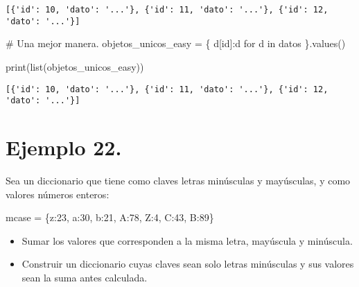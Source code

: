 \documentclass[
  letterpaper,
  DIV=11,
  numbers=noendperiod]{scrreprt}
\newenvironment{Shaded}{\begin{snugshade}}{\end{snugshade}}
\newcommand{\BuiltInTok}[1]{\textcolor[rgb]{0.00,0.23,0.31}{#1}}
\newcommand{\CommentTok}[1]{\textcolor[rgb]{0.37,0.37,0.37}{#1}}
\newcommand{\ControlFlowTok}[1]{\textcolor[rgb]{0.00,0.23,0.31}{#1}}
\newcommand{\DecValTok}[1]{\textcolor[rgb]{0.68,0.00,0.00}{#1}}
\newcommand{\KeywordTok}[1]{\textcolor[rgb]{0.00,0.23,0.31}{#1}}
\newcommand{\NormalTok}[1]{\textcolor[rgb]{0.00,0.23,0.31}{#1}}
\newcommand{\OperatorTok}[1]{\textcolor[rgb]{0.37,0.37,0.37}{#1}}
\newcommand{\StringTok}[1]{\textcolor[rgb]{0.13,0.47,0.30}{#1}}
\begin{document}
\begin{verbatim}
[{'id': 10, 'dato': '...'}, {'id': 11, 'dato': '...'}, {'id': 12, 'dato': '...'}]
\end{verbatim}

\begin{Shaded}
\begin{Highlighting}[]
\CommentTok{\# Una mejor manera.}
\NormalTok{objetos\_unicos\_easy }\OperatorTok{=}\NormalTok{ \{ d[}\StringTok{\textquotesingle{}id\textquotesingle{}}\NormalTok{]:d }\ControlFlowTok{for}\NormalTok{ d }\KeywordTok{in}\NormalTok{ datos \}.values()}

\BuiltInTok{print}\NormalTok{(}\BuiltInTok{list}\NormalTok{(objetos\_unicos\_easy))}
\end{Highlighting}
\end{Shaded}

\begin{verbatim}
[{'id': 10, 'dato': '...'}, {'id': 11, 'dato': '...'}, {'id': 12, 'dato': '...'}]
\end{verbatim}

\section{\texorpdfstring{\textbf{Ejemplo
22.}}{Ejemplo 22.}}\label{ejemplo-22.}

Sea un diccionario que tiene como claves letras minúsculas y mayúsculas,
y como valores números enteros:

\begin{Shaded}
\begin{Highlighting}[]
\NormalTok{mcase }\OperatorTok{=}\NormalTok{ \{}\StringTok{\textquotesingle{}z\textquotesingle{}}\NormalTok{:}\DecValTok{23}\NormalTok{, }\StringTok{\textquotesingle{}a\textquotesingle{}}\NormalTok{:}\DecValTok{30}\NormalTok{, }\StringTok{\textquotesingle{}b\textquotesingle{}}\NormalTok{:}\DecValTok{21}\NormalTok{, }\StringTok{\textquotesingle{}A\textquotesingle{}}\NormalTok{:}\DecValTok{78}\NormalTok{, }\StringTok{\textquotesingle{}Z\textquotesingle{}}\NormalTok{:}\DecValTok{4}\NormalTok{, }\StringTok{\textquotesingle{}C\textquotesingle{}}\NormalTok{:}\DecValTok{43}\NormalTok{, }\StringTok{\textquotesingle{}B\textquotesingle{}}\NormalTok{:}\DecValTok{89}\NormalTok{\}}
\end{Highlighting}
\end{Shaded}

\begin{itemize}
\item
  Sumar los valores que corresponden a la misma letra, mayúscula y
  minúscula.
\item
  Construir un diccionario cuyas claves sean solo letras minúsculas y
  sus valores sean la suma antes calculada.
\end{itemize}
\end{document}
